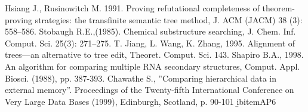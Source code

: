 \documentclass{article}
\begin{document}
\begin{thebibliography}{99}
 Hsiang J., Rusinowitch M. 1991. Proving refutational completeness of theorem-proving strategies: the transfinite semantic tree method, J. ACM (JACM) 38 (3): 558–586.
 Stobaugh R.E.,(1985). Chemical substructure searching, J. Chem. Inf. Comput. Sci. 25(3):  271–275.
 T. Jiang, L. Wang, K. Zhang, 1995. Alignment of trees—an alternative to tree edit, Theoret. Comput. Sci. 143.
 Shapiro B.A., 1998. An algorithm for comparing multiple RNA secondary structures, Comput. Appl. Biosci. (1988), pp. 387-393.
 Chawathe S., ”Comparing hierarchical data in external memory”. Proceedings of the Twenty-fifth International Conference on Very Large Data Bases (1999), Edinburgh, Scotland, p. 90-101
\b ibitem{AP6}


\end{thebibliography}
\end{document}
